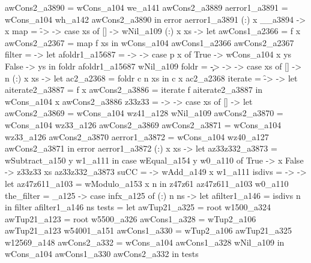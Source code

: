                               awCons2_a3890 = wCons_a104 we_a141 awCons2_a3889
                              aerror1_a3891 = wCons_a104 wh_a142 awCons2_a3890
                            in error aerror1_a3891
                          (:) x __a3894 -> x
          map = \f -> \xs -> case xs of
                               [] -> wNil_a109
                               (:) x xs ->
                                 let
                                   awCons1_a2366 = f x
                                   awCons2_a2367 = map f xs
                                 in wCons_a104 awCons1_a2366 awCons2_a2367
          filter = \p -> let
                           afoldr1_a15687 = \x -> \ys -> case p x of
                                                           True -> wCons_a104 x ys
                                                           False -> ys
                         in foldr afoldr1_a15687 wNil_a109
          foldr = \c -> \n -> \xs -> case xs of
                                       [] -> n
                                       (:) x xs ->
                                         let ac2_a2368 = foldr c n xs
                                         in c x ac2_a2368
          iterate = \f -> \x -> let
                                  aiterate2_a3887 = f x
                                  awCons2_a3886 = iterate f aiterate2_a3887
                                in wCons_a104 x awCons2_a3886
          z33z33 = \xs -> \y -> case xs of
                                  [] ->
                                    let
                                      awCons2_a3869 = wCons_a104 wz41_a128 wNil_a109
                                      awCons2_a3870 = wCons_a104 wz33_a126 awCons2_a3869
                                      awCons2_a3871 = wCons_a104 wz33_a126 awCons2_a3870
                                      aerror1_a3872 = wCons_a104 wz40_a127 awCons2_a3871
                                    in error aerror1_a3872
                                  (:) x xs ->
                                    let az33z332_a3873 = wSubtract_a150 y w1_a111
                                    in case wEqual_a154 y w0_a110 of
                                         True -> x
                                         False -> z33z33 xs az33z332_a3873
          suCC = \x -> wAdd_a149 x w1_a111
          isdivs = \n -> \x -> let az47z611_a103 = wModulo_a153 x n
                               in z47z61 az47z611_a103 w0_a110
          the_filter = \infx_a125 -> case infx_a125 of
                                       (:) n ns ->
                                         let afilter1_a146 = isdivs n
                                         in filter afilter1_a146 ns
          tests = let
                    awTup21_a325 = root w1500_a324
                    awTup21_a123 = root w5500_a326
                    awCons1_a328 = wTup2_a106 awTup21_a123 w54001_a151
                    awCons1_a330 = wTup2_a106 awTup21_a325 w12569_a148
                    awCons2_a332 = wCons_a104 awCons1_a328 wNil_a109
                  in wCons_a104 awCons1_a330 awCons2_a332
        in tests

